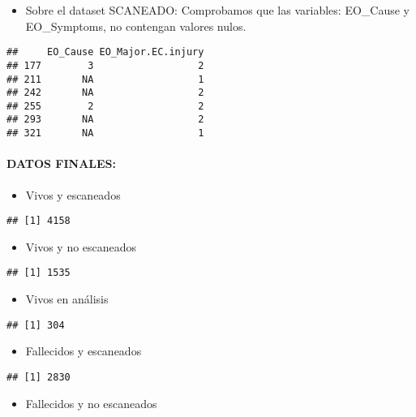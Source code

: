 \documentclass[]{article}
\providecommand{\tightlist}{%
  \setlength{\itemsep}{0pt}\setlength{\parskip}{0pt}}
\let\oldparagraph\paragraph
\renewcommand{\paragraph}[1]{\oldparagraph{#1}\mbox{}}
\begin{document}
\begin{itemize}
\tightlist
\item
  Sobre el dataset SCANEADO: Comprobamos que las variables: EO\_Cause y
  EO\_Symptoms, no contengan valores nulos.
\end{itemize}

\begin{verbatim}
##     EO_Cause EO_Major.EC.injury
## 177        3                  2
## 211       NA                  1
## 242       NA                  2
## 255        2                  2
## 293       NA                  2
## 321       NA                  1
\end{verbatim}

\paragraph{DATOS FINALES:}\label{datos-finales-1}

\begin{itemize}
\tightlist
\item
  Vivos y escaneados
\end{itemize}

\begin{verbatim}
## [1] 4158
\end{verbatim}

\begin{itemize}
\tightlist
\item
  Vivos y no escaneados
\end{itemize}

\begin{verbatim}
## [1] 1535
\end{verbatim}

\begin{itemize}
\tightlist
\item
  Vivos en análisis
\end{itemize}

\begin{verbatim}
## [1] 304
\end{verbatim}

\begin{itemize}
\tightlist
\item
  Fallecidos y escaneados
\end{itemize}

\begin{verbatim}
## [1] 2830
\end{verbatim}

\begin{itemize}
\tightlist
\item
  Fallecidos y no escaneados
\end{itemize}
\end{document}
